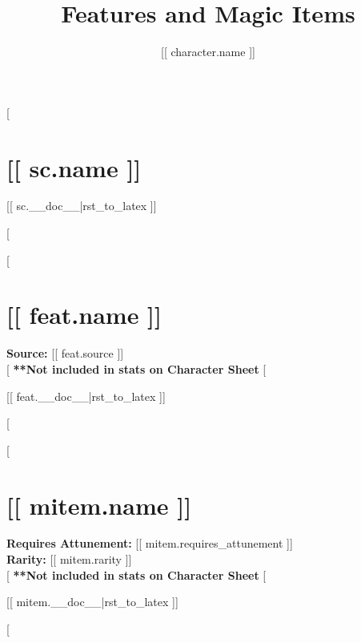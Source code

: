\documentclass[twocolumn,lettersize]{article}
\title{Features and Magic Items}
\author{[[ character.name ]]}
\date{}
\begin{document}
\maketitle

[%

  \section*{[[ sc.name ]]}

  [[ sc.__doc__|rst_to_latex ]]

[%
  
[%

  \section*{[[ feat.name ]]}

  \noindent
  \textbf{Source:} [[ feat.source ]] \\

  [%
    \textbf{**Not included in stats on Character Sheet} %
  [%
             
  [[ feat.__doc__|rst_to_latex ]]

[%

[%

  \section*{[[ mitem.name ]]}

  \noindent
  \textbf{Requires Attunement:} [[ mitem.requires_attunement ]] \\
  \textbf{Rarity:} [[ mitem.rarity ]] \\

  [%
    \textbf{**Not included in stats on Character Sheet} %
  [%
             
  [[ mitem.__doc__|rst_to_latex ]]

  [%
    
\end{document}
